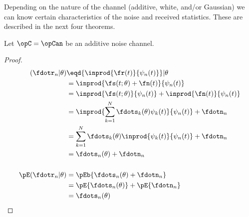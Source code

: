 Depending on the nature of the channel (additive, white, and/or Gaussian)
we can know certain characteristics of the noise and received statistics.
These are described in the next four theorems.


\begin{theorem}%
\label{thm:an_stats}
Let $\opC=\opCan$ be an additive noise channel.
\end{theorem}
\begin{proof}
\begin{align*}
   (\fdotr_n |\theta)
     &\eqd {\inprod{\fr(t)}{\psi_n(t)}}  |\theta
   \\&=    {\inprod{\fs(t;\theta)+\fn(t)}{\psi_n(t)}} 
   \\&=    {\inprod{\fs(t;\theta)}{\psi_n(t)}} +   {\inprod{\fn(t)}{\psi_n(t)}} 
   \\&=    \inprod{\sum_{k=1}^N \fdots_k(\theta) \psi_k(t)}{\psi_n(t)} + \fdotn_n 
   \\&=    \sum_{k=1}^N \fdots_k(\theta) \inprod{\psi_k(t)}{\psi_n(t)} + \fdotn_n 
   \\&=    \fdots_n(\theta)  + \fdotn_n
\\ \\
   \pE({\fdotr_n} | \theta)
     &= \pEb{\fdots_n(\theta)  + \fdotn_n}
   \\&= \pE{\fdots_n(\theta) } +   \pE{\fdotn_n}
   \\&= \fdots_n(\theta)  
\end{align*}
\end{proof}


